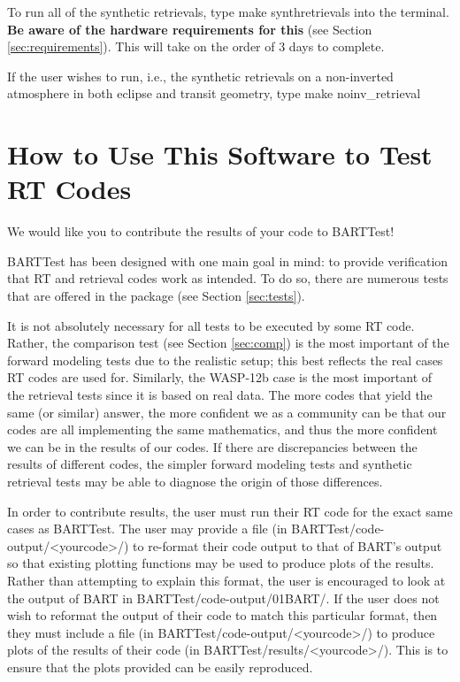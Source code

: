 \documentclass[letterpaper, 12pt]{article}
\begin{document}
To run all of the synthetic retrievals, type
\beginverbatim
make synthretrievals
\endverbatim
into the terminal. \textbf{Be aware of the hardware requirements for this} 
(see Section \ref{sec:requirements}). This will take on the order of 3 
days to complete.

If the user wishes to run, i.e., the synthetic retrievals on a non-inverted 
atmosphere in both eclipse and transit geometry, type
\beginverbatim
make noinv_retrieval
\endverbatim

\section{How to Use This Software to Test RT Codes}
\label{sec:howto}
We would like you to contribute the results of your code to BARTTest! 

BARTTest has been designed with one main goal in mind: to provide verification 
that RT and retrieval codes work as intended. To do so, there are numerous 
tests that are offered in the package (see Section \ref{sec:tests}).

It is not absolutely necessary for all tests to be executed by some RT code. 
Rather, the comparison test (see Section \ref{sec:comp}) is the most important 
of the forward modeling tests due to the realistic setup; this best reflects 
the real cases RT codes are used for. Similarly, the WASP-12b case is the most 
important of the retrieval tests since it is based on real data. The more 
codes that yield the same (or similar) answer, the more confident we as a 
community can be that our codes are all implementing the same mathematics, 
and thus the more confident we can be in the results of our codes. If there 
are discrepancies between the results of different codes, the simpler forward 
modeling tests and synthetic retrieval tests may be able to diagnose the origin 
of those differences.

In order to contribute results, the user must run their RT code for the exact 
same cases as BARTTest. The user may provide a file 
(in BARTTest/code-output/{\textless}yourcode{\textgreater}/) to re-format 
their code output to that of BART's output so that existing plotting functions 
may be used to produce plots of the results. Rather than attempting 
to explain this format, the user is encouraged to look at the output of BART 
in BARTTest/code-output/01BART/. If the user does not wish to reformat the 
output of their code to match this particular format, then they must include a 
file (in BARTTest/code-output/{\textless}yourcode{\textgreater}/) to produce 
plots of the results of their code 
(in BARTTest/results/{\textless}yourcode{\textgreater}/). 
This is to ensure that the plots provided can be easily reproduced.
\end{document}
